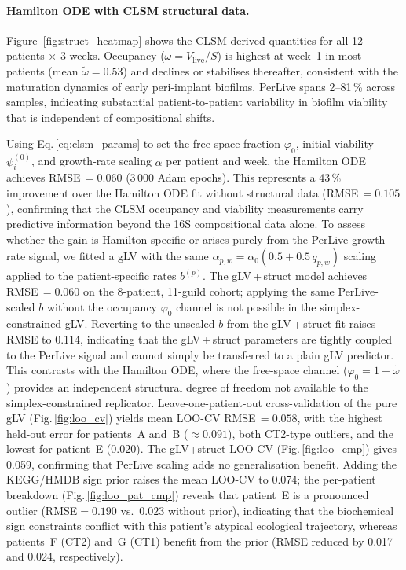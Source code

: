 \documentclass[11pt,a4paper]{article}
\begin{document}
\paragraph{Hamilton ODE with CLSM structural data.}
Figure~\ref{fig:struct_heatmap} shows the CLSM-derived quantities for all 12 patients $\times$ 3 weeks.
Occupancy ($\omega = V_\mathrm{live}/S$) is highest at week~1 in most patients (mean $\tilde\omega = 0.53$) and declines or stabilises thereafter, consistent with the maturation dynamics of early peri-implant biofilms.
PerLive spans 2--81\,\% across samples, indicating substantial patient-to-patient variability in biofilm viability that is independent of compositional shifts.

Using Eq.\,\eqref{eq:clsm_params} to set the free-space fraction $\varphi_0$, initial viability $\psi_i^{(0)}$, and growth-rate scaling $\alpha$ per patient and week, the Hamilton ODE achieves RMSE\,$= 0.060$ (3\,000 Adam epochs).
This represents a 43\,\% improvement over the Hamilton ODE fit without structural data (RMSE\,$= 0.105$), confirming that the CLSM occupancy and viability measurements carry predictive information beyond the 16S compositional data alone.
To assess whether the gain is Hamilton-specific or arises purely from the PerLive growth-rate signal, we fitted a gLV with the same $\alpha_{p,w} = \alpha_0(0.5 + 0.5\,q_{p,w})$ scaling applied to the patient-specific rates $b^{(p)}$.
The gLV\,+\,struct model achieves RMSE\,$= 0.060$ on the 8-patient, 11-guild cohort; applying the same PerLive-scaled $b$ without the occupancy $\varphi_0$ channel is not possible in the simplex-constrained gLV.
Reverting to the unscaled $b$ from the gLV\,+\,struct fit raises RMSE to 0.114, indicating that the gLV\,+\,struct parameters are tightly coupled to the PerLive signal and cannot simply be transferred to a plain gLV predictor.
This contrasts with the Hamilton ODE, where the free-space channel ($\varphi_0 = 1 - \tilde\omega$) provides an independent structural degree of freedom not available to the simplex-constrained replicator.
Leave-one-patient-out cross-validation of the pure gLV (Fig.\,\ref{fig:loo_cv}) yields mean LOO-CV RMSE\,$= 0.058$, with the highest held-out error for patients~A and~B ($\approx 0.091$), both CT2-type outliers, and the lowest for patient~E ($0.020$).
The gLV+struct LOO-CV (Fig.\,\ref{fig:loo_cmp}) gives 0.059, confirming that PerLive scaling adds no generalisation benefit.
Adding the KEGG/HMDB sign prior raises the mean LOO-CV to 0.074; the per-patient breakdown (Fig.\,\ref{fig:loo_pat_cmp}) reveals that patient~E is a pronounced outlier (RMSE$=0.190$ vs.\ $0.023$ without prior), indicating that the biochemical sign constraints conflict with this patient's atypical ecological trajectory, whereas patients~F (CT2) and~G (CT1) benefit from the prior (RMSE reduced by 0.017 and 0.024, respectively).
\end{document}
